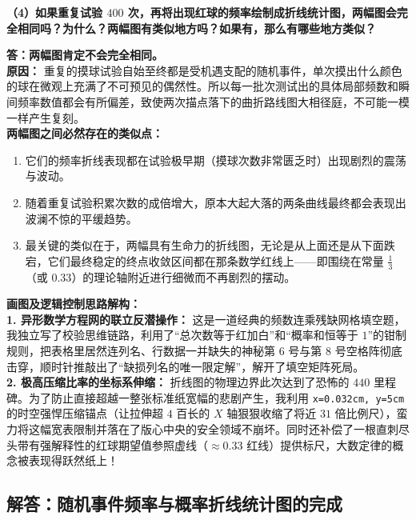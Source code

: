 \textbf{（4）如果重复试验 $400$ 次，再将出现红球的频率绘制成折线统计图，两幅图会完全相同吗？为什么？两幅图有类似地方吗？如果有，那么有哪些地方类似？}

\vspace{0.2cm}
\textbf{答：两幅图肯定不会完全相同。}\\
\textbf{原因：} 重复的摸球试验自始至终都是受机遇支配的随机事件，单次摸出什么颜色的球在微观上充满了不可预见的偶然性。所以每一批次测试出的具体局部频数和瞬间频率数值都会有所偏差，致使两次描点落下的曲折路线图大相径庭，不可能一模一样产生复刻。\\
\textbf{两幅图之间必然存在的类似点：} 
\begin{enumerate}
    \item 它们的频率折线表现都在试验极早期（摸球次数非常匮乏时）出现剧烈的震荡与波动。
    \item 随着重复试验积累次数的成倍增大，原本大起大落的两条曲线最终都会表现出波澜不惊的平缓趋势。
    \item 最关键的类似在于，两幅具有生命力的折线图，无论是从上面还是从下面跌宕，它们最终稳定的终点收敛区间都在那条数学红线上——即围绕在常量 $\frac{1}{3}$（或 $0.33$）的理论轴附近进行细微而不再剧烈的摆动。
\end{enumerate}

\vspace{0.6cm}

{\small\color{blue!70!black}
\textbf{画图及逻辑控制思路解构：}\\
\textbf{1. 异形数学方程网的联立反潜操作：} 这是一道经典的频数连乘残缺网格填空题，我独立写了校验思维链路，利用了“总次数等于红加白”和“概率和恒等于 $1$”的钳制规则，把表格里居然连列名、行数据一并缺失的神秘第 $6$ 号与第 $8$ 号空格阵彻底击穿，顺时针推敲出了“缺损列名的唯一限定解”，解开了填空矩阵死局。\\
\textbf{2. 极高压缩比率的坐标系伸缩：} 折线图的物理边界此次达到了恐怖的 $440$ 里程碑。为了防止直接超越一整张标准纸宽幅的悲剧产生，我利用 \texttt{x=0.032cm, y=5cm} 的时空强悍压缩锚点（让拉伸超 $4$ 百长的 $X$ 轴狠狠收缩了将近 $31$ 倍比例尺），蛮力将这幅宽表限制并落在了版心中央的安全领域不崩坏。同时还补偿了一根直刺尽头带有强解释性的红球期望值参照虚线（$\approx 0.33$ 红线）提供标尺，大数定律的概念被表现得跃然纸上！
}


\newpage

\newpage

\subsection{解答：随机事件频率与概率折线统计图的完成}

